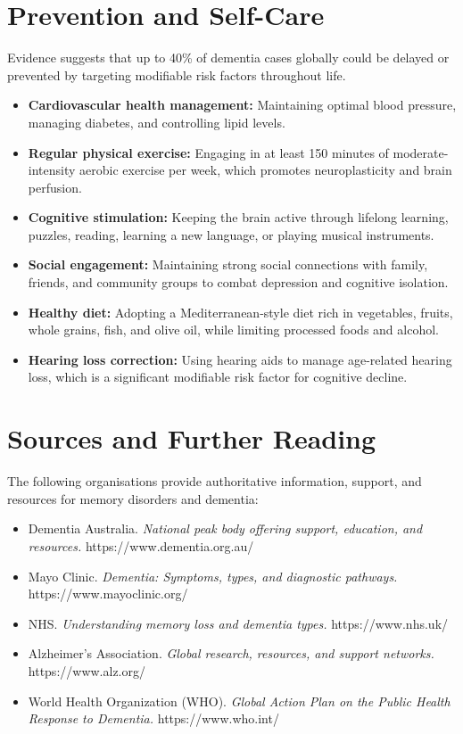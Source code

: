 \section*{Prevention and Self-Care}
Evidence suggests that up to 40\% of dementia cases globally could be delayed or prevented by targeting modifiable risk factors throughout life.
\begin{itemize}
    \item \textbf{Cardiovascular health management:} Maintaining optimal blood pressure, managing diabetes, and controlling lipid levels.
    \item \textbf{Regular physical exercise:} Engaging in at least 150 minutes of moderate-intensity aerobic exercise per week, which promotes neuroplasticity and brain perfusion.
    \item \textbf{Cognitive stimulation:} Keeping the brain active through lifelong learning, puzzles, reading, learning a new language, or playing musical instruments.
    \item \textbf{Social engagement:} Maintaining strong social connections with family, friends, and community groups to combat depression and cognitive isolation.
    \item \textbf{Healthy diet:} Adopting a Mediterranean-style diet rich in vegetables, fruits, whole grains, fish, and olive oil, while limiting processed foods and alcohol.
    \item \textbf{Hearing loss correction:} Using hearing aids to manage age-related hearing loss, which is a significant modifiable risk factor for cognitive decline.
\end{itemize}

\section*{Sources and Further Reading}
The following organisations provide authoritative information, support, and resources for memory disorders and dementia:
\begin{itemize}
    \item Dementia Australia. \textit{National peak body offering support, education, and resources.} https://www.dementia.org.au/
    \item Mayo Clinic. \textit{Dementia: Symptoms, types, and diagnostic pathways.} https://www.mayoclinic.org/
    \item NHS. \textit{Understanding memory loss and dementia types.} https://www.nhs.uk/
    \item Alzheimer's Association. \textit{Global research, resources, and support networks.} https://www.alz.org/
    \item World Health Organization (WHO). \textit{Global Action Plan on the Public Health Response to Dementia.} https://www.who.int/
\end{itemize}
